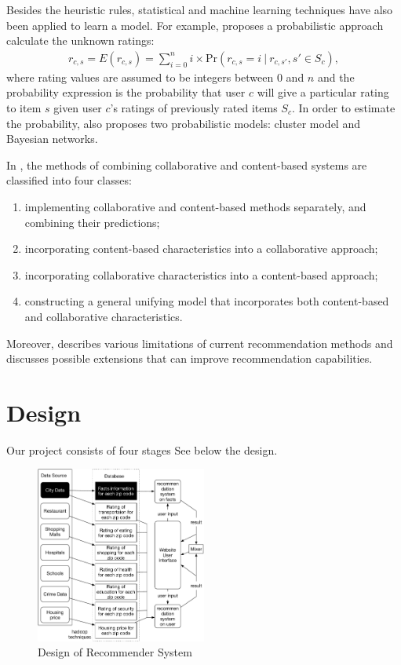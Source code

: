 \documentclass[letterpaper,twocolumn,10pt]{article}
\begin{document}
Besides the heuristic rules,  statistical and machine learning techniques have also  been applied to  learn a model. For example, \cite{BHK98} proposes a probabilistic approach calculate the unknown ratings:
\begin{align} \label{prob}
r_{c, s} = E(r_{c, s}) = \sum_{i=0}^n i\times \text{Pr}(r_{c, s} =i\ |\ r_{c, s'}, s'\in S_c ), 
\end{align}
where rating values are assumed to be integers between  0 and $n$ and the probability expression is the probability that user $c$ will give a particular rating to item $s$ given user $c$'s ratings of previously rated items $S_c$.  In order to estimate  the probability, \cite{BHK98} also proposes two  probabilistic models: cluster model and Bayesian networks.  

In \cite{AT05}, the methods of combining  collaborative and content-based systems are classified into four classes:
\begin{enumerate}
\item implementing collaborative and content-based methods separately, and combining their predictions;
\item incorporating content-based characteristics into a collaborative approach;
\item incorporating collaborative characteristics into a content-based approach;
\item constructing a general unifying model that incorporates both content-based and collaborative characteristics.
\end{enumerate}

Moreover, \cite{AT05}  describes various limitations of current recommendation methods and discusses possible extensions that can improve recommendation capabilities. 

\section{Design}
Our project consists of four stages
 See below the design.
\begin{figure}[h!]\label{fig1}
\begin{center}
\includegraphics[width=0.5\textwidth]{design.pdf}
\end{center}
\caption{ Design of Recommender System}
\end{figure}
\end{document}
